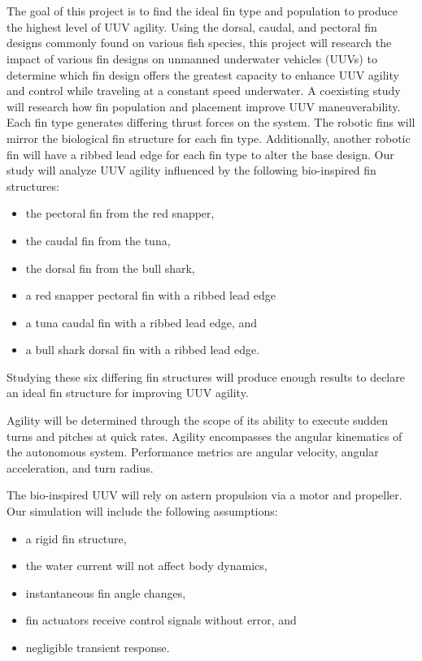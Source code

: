 \documentclass[]{IEEEtran}
\begin{document}
\section{}
The goal of this project is to find the ideal fin type and population to produce the highest level of UUV agility.  Using the dorsal, caudal, and pectoral fin designs commonly found on various fish species, this project will research the impact of various fin designs on unmanned underwater vehicles (UUVs) to determine which fin design offers the greatest capacity to enhance UUV agility and control while traveling at a constant speed underwater.   A coexisting study will research how fin population and placement improve UUV maneuverability.   Each fin type generates differing thrust forces on the system.  The robotic fins will mirror the biological fin structure for each fin type. Additionally, another robotic fin will have a ribbed lead edge for each fin type to alter the base design.  Our study will analyze UUV agility influenced by the following bio-inspired fin structures:
\begin{itemize}
\item the pectoral fin from the red snapper,
\item the caudal fin from the tuna, 
\item the dorsal fin from the bull shark,
\item a red snapper pectoral fin with a ribbed lead edge
\item a tuna caudal fin with a ribbed lead edge, and
\item a bull shark dorsal fin with a ribbed lead edge.  
\end{itemize}
Studying these six differing fin structures will produce enough results to declare an ideal fin structure for improving UUV agility.   

Agility will be determined through the scope of its ability to execute sudden turns and pitches at quick rates.  Agility encompasses the angular kinematics of the autonomous system.  Performance metrics are angular velocity, angular acceleration, and turn radius.

The bio-inspired UUV will rely on astern propulsion via a motor and propeller. Our simulation will include the following assumptions:
\begin{itemize}
\item a rigid fin structure,  
\item the water current will not affect body dynamics,  
\item instantaneous fin angle changes,
\item fin actuators receive control signals without error, and
\item negligible transient response.
\end{itemize}
\end{document}
